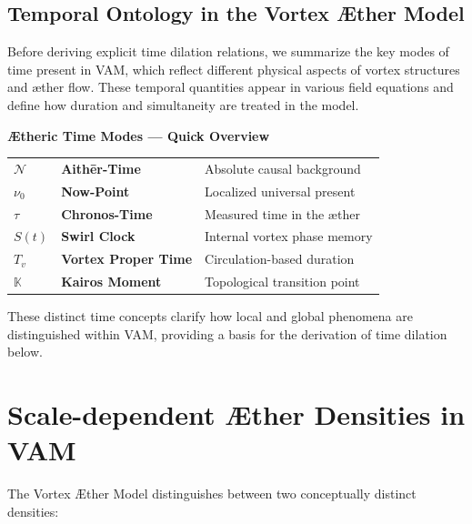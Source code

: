 \subsection*{Temporal Ontology in the Vortex Æther Model}

Before deriving explicit time dilation relations, we summarize the key modes of time present in VAM, which reflect different physical aspects of vortex structures and æther flow. These temporal quantities appear in various field equations and define how duration and simultaneity are treated in the model.

\begin{center}
    \begin{tcolorbox}[colback=gray!10, colframe=black, width=0.9\textwidth, sharp corners=southwest, boxrule=0.5pt]
        \textbf{Ætheric Time Modes — Quick Overview}
        \vspace{0.5em}
        \begin{tabular}{@{}p{1.5cm}p{5.2cm}p{6cm}@{}}
            \(\mathcal{N}\)     & \textbf{Aithēr-Time}         & Absolute causal background \\
            \(\nu_0\)           & \textbf{Now-Point}           & Localized universal present \\
            \(\tau\)            & \textbf{Chronos-Time}        & Measured time in the æther \\
            \(S(t)\)            & \textbf{Swirl Clock}         & Internal vortex phase memory \\
            \(T_v\)             & \textbf{Vortex Proper Time}  & Circulation-based duration \\
            \(\mathbb{K}\)      & \textbf{Kairos Moment}       & Topological transition point \\
        \end{tabular}
    \end{tcolorbox}
    \label{tab:ÆtherTimeModes}
\end{center}
These distinct time concepts clarify how local and global phenomena are distinguished within VAM, providing a basis for the derivation of time dilation below.

\section*{Scale-dependent Æther Densities in VAM}


The Vortex Æther Model distinguishes between two conceptually distinct densities:

